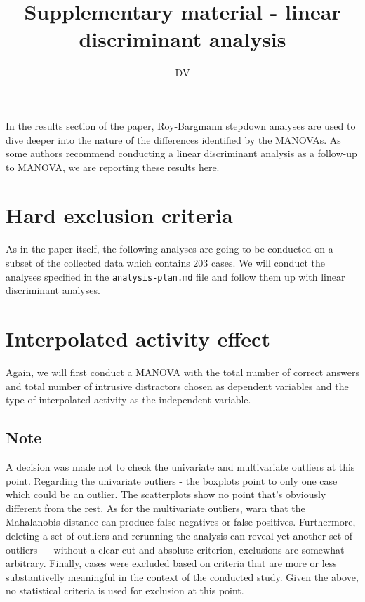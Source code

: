 \documentclass[11pt,]{article}
\title{Supplementary material - linear discriminant analysis}
\author{DV}
\date{}
\begin{document}
\maketitle

{
\setcounter{tocdepth}{4}
\tableofcontents
}
In the results section of the paper, Roy-Bargmann stepdown analyses are
used to dive deeper into the nature of the differences identified by the
MANOVAs. As some authors
\citep[eg.][]{tabachnickUsingMultivariateStatistics2012,salkindEncyclopediaMeasurementStatistics2007,
fieldDiscoveringStatisticsUsing2012} recommend conducting a linear
discriminant analysis as a follow-up to MANOVA, we are reporting these
results here.

\hypertarget{hard-exclusion-criteria}{%
\section{Hard exclusion criteria}\label{hard-exclusion-criteria}}

As in the paper itself, the following analyses are going to be conducted
on a subset of the collected data which contains 203 cases. We will
conduct the analyses specified in the \texttt{analysis-plan.md} file and
follow them up with linear discriminant analyses.

\hypertarget{interpolated-activity-effect}{%
\section{Interpolated activity
effect}\label{interpolated-activity-effect}}

Again, we will first conduct a MANOVA with the total number of correct
answers and total number of intrusive distractors chosen as dependent
variables and the type of interpolated activity as the independent
variable.

\hypertarget{note}{%
\subsection{Note}\label{note}}

A decision was made not to check the univariate and multivariate
outliers at this point. Regarding the univariate outliers - the boxplots
point to only one case which could be an outlier. The scatterplots show
no point that's obviously different from the rest. As for the
multivariate outliers, \citet{tabachnickUsingMultivariateStatistics2012}
warn that the Mahalanobis distance can produce false negatives or false
positives. Furthermore, deleting a set of outliers and rerunning the
analysis can reveal yet another set of outliers --- without a clear-cut
and absolute criterion, exclusions are somewhat arbitrary. Finally,
cases were excluded based on criteria that are more or less
substantivelly meaningful in the context of the conducted study. Given
the above, no statistical criteria is used for exclusion at this point.
\end{document}
